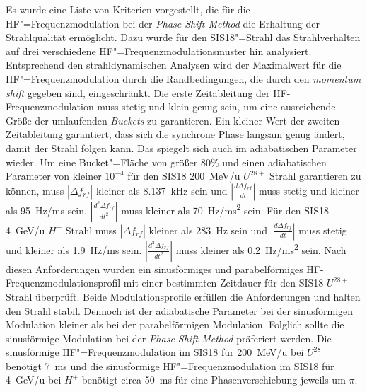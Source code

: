 Es wurde eine Liste von Kriterien vorgestellt, die f\"ur die HF"=Frequenzmodulation bei der \textit{Phase Shift Method} die Erhaltung der Strahlqualit\"at erm\"oglicht. Dazu wurde f\"ur den SIS18"=Strahl das Strahlverhalten auf drei verschiedene HF"=Frequenzmodulationsmuster hin analysiert. Entsprechend den strahldynamischen Analysen wird der Maximalwert f\"ur die HF"=Frequenzmodulation durch die Randbedingungen, die durch den \textit{momentum shift} gegeben sind, eingeschr\"ankt. Die erste Zeitableitung der HF-Frequenzmodulation muss stetig und klein genug sein, um eine ausreichende Gr\"oße der umlaufenden \textit{Buckets}  zu garantieren. Ein kleiner Wert der zweiten Zeitableitung garantiert,  dass sich die synchrone Phase langsam genug ändert, damit der Strahl folgen kann. Das spiegelt sich auch im adiabatischen Parameter wieder. Um eine Bucket"=Fl\"ache von größer 80$\%$  und einen adiabatischen Parameter von kleiner $10^{-4}$ f\"ur den SIS18 \SI{200}{MeV/u} $U^\mathit{28+}$ Strahl garantieren zu k\"onnen, muss $|\Delta f_{\mathit{rf}}|$ kleiner als \SI{8.137}{kHz} sein und $|\frac{d\Delta f_{\mathit{rf}}}{dt}|$ muss stetig und kleiner als \SI{95}{Hz/ms} sein. $|\frac{d^2\Delta f_{\mathit{rf}}}{dt^2}|$ muss kleiner als \SI{70}{Hz/ms^2} sein. Für den SIS18 \SI{4}{GeV/u} $H^{+}$ Strahl muss $|\Delta f_{\mathit{rf}}|$ kleiner als \SI{283}{Hz} sein und $|\frac{d\Delta f_{\mathit{rf}}}{dt}|$ muss stetig und kleiner als \SI{1.9}{Hz/ms} sein. $|\frac{d^2\Delta f_{\mathit{rf}}}{dt^2}|$ muss kleiner als \SI{0.2}{Hz/ms^2} sein. Nach diesen Anforderungen wurden ein sinusförmiges und parabelförmiges HF-Frequenzmodulationsprofil mit einer bestimmten Zeitdauer f\"ur den SIS18 $U^{28+}$ Strahl \"uberpr\"uft. Beide Modulationsprofile erfüllen die Anforderungen und halten den Strahl stabil. Dennoch ist der adiabatische Parameter bei der sinusf\"ormigen Modulation kleiner als bei der parabelförmigen Modulation. Folglich sollte die sinusförmige Modulation bei der \textit{Phase Shift Method} pr\"aferiert werden. Die sinusf\"ormige HF"=Frequenzmodulation im SIS18 f\"ur
\SI{200}{MeV/u} bei $U^\mathit{28+}$ ben\"otigt \SI{7}{\ms} und die sinusf\"ormige HF"=Frequenzmodulation im SIS18 f\"ur \SI{4}{GeV/u} bei $H^+$ ben\"otigt circa \SI{50}{\ms} f\"ur eine Phasenverschiebung jeweils um $\pi$.   

